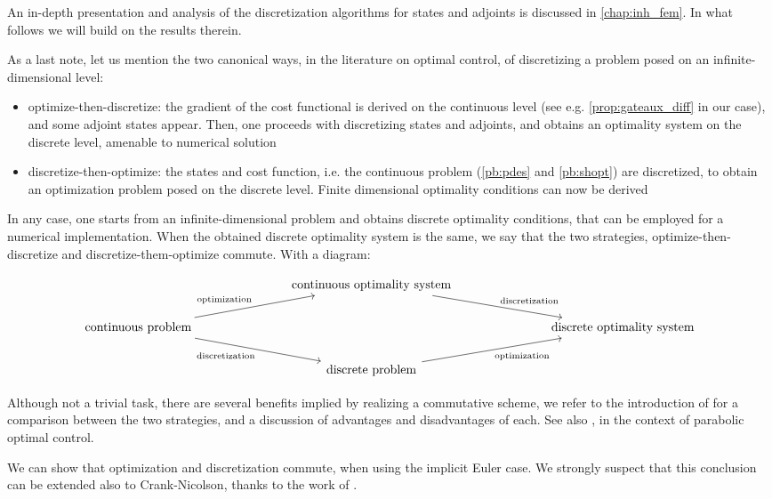 \documentclass[english,a4paper,9pt,oneside]{scrbook}	%
\theoremstyle{break}
\theoremstyle{remark}
\begin{document}
An in-depth presentation and analysis of the discretization algorithms for states and adjoints is discussed in \cref{chap:inh_fem}. In what follows we will build on the results therein.

As a last note, let us mention the two canonical ways, in the literature on optimal control, of discretizing a problem posed on an infinite-dimensional level:

\begin{itemize}
	\item optimize-then-discretize: the gradient of the cost functional is derived on the continuous level (see e.g. \cref{prop:gateaux_diff} in our case), and some adjoint states appear. Then, one proceeds with discretizing states and adjoints, and obtains an optimality system on the discrete level, amenable to numerical solution
	\item discretize-then-optimize: the states and cost function, i.e. the continuous problem (\cref{pb:pdes} and \cref{pb:shopt}) are discretized, to obtain an optimization problem posed on the discrete level. Finite dimensional optimality conditions can now be derived
\end{itemize}

In any case, one starts from an infinite-dimensional problem and obtains discrete optimality conditions, that can be employed for a numerical implementation. When the obtained discrete optimality system is the same, we say that the two strategies, optimize-then-discretize and discretize-them-optimize commute. With a diagram:

\[\begin{tikzcd}
	&&& \text{continuous optimality system} \\
	\text{continuous problem} &&&&&& \text{discrete optimality system}  \\
	&&& \text{discrete problem} 
	\arrow["{\text{optimization}}"', from=3-4, to=2-7]
	\arrow["{\text{discretization}}", from=1-4, to=2-7]
	\arrow["{\text{optimization}}", from=2-1, to=1-4]
	\arrow["{\text{discretization}}"', from=2-1, to=3-4]
\end{tikzcd}\]

Although not a trivial task, there are several benefits implied by realizing a commutative scheme, we refer to the introduction of \cite{liu} for a comparison between the two strategies, and a discussion of advantages and disadvantages of each. See also \cite{flaig}, in the context of parabolic optimal control.

We can show that optimization and discretization commute, when using the implicit Euler case. We strongly suspect that this conclusion can be extended also to Crank-Nicolson, thanks to the work of \cite{flaig}.
\end{document}
